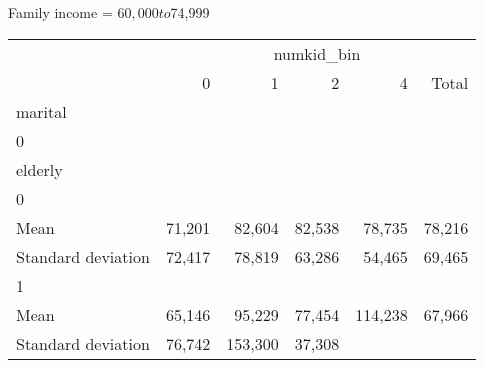 Family income = $60,000 to $74,999
\begin{tabular}{llllll}
\cline{1-6}
\multicolumn{1}{c}{} &
  \multicolumn{5}{|c}{numkid\_bin} \\
\multicolumn{1}{c}{} &
  \multicolumn{1}{|r}{0} &
  \multicolumn{1}{r}{1} &
  \multicolumn{1}{r}{2} &
  \multicolumn{1}{r}{4} &
  \multicolumn{1}{r}{Total} \\
\cline{1-6}
\multicolumn{1}{l}{marital} &
  \multicolumn{1}{|r}{} &
  \multicolumn{1}{r}{} &
  \multicolumn{1}{r}{} &
  \multicolumn{1}{r}{} &
  \multicolumn{1}{r}{} \\
\multicolumn{1}{l}{\hspace{1em}0} &
  \multicolumn{1}{|r}{} &
  \multicolumn{1}{r}{} &
  \multicolumn{1}{r}{} &
  \multicolumn{1}{r}{} &
  \multicolumn{1}{r}{} \\
\multicolumn{1}{l}{\hspace{2em}elderly} &
  \multicolumn{1}{|r}{} &
  \multicolumn{1}{r}{} &
  \multicolumn{1}{r}{} &
  \multicolumn{1}{r}{} &
  \multicolumn{1}{r}{} \\
\multicolumn{1}{l}{\hspace{3em}0} &
  \multicolumn{1}{|r}{} &
  \multicolumn{1}{r}{} &
  \multicolumn{1}{r}{} &
  \multicolumn{1}{r}{} &
  \multicolumn{1}{r}{} \\
\multicolumn{1}{l}{\hspace{4em}Mean} &
  \multicolumn{1}{|r}{71,201} &
  \multicolumn{1}{r}{82,604} &
  \multicolumn{1}{r}{82,538} &
  \multicolumn{1}{r}{78,735} &
  \multicolumn{1}{r}{78,216} \\
\multicolumn{1}{l}{\hspace{4em}Standard deviation} &
  \multicolumn{1}{|r}{72,417} &
  \multicolumn{1}{r}{78,819} &
  \multicolumn{1}{r}{63,286} &
  \multicolumn{1}{r}{54,465} &
  \multicolumn{1}{r}{69,465} \\
\multicolumn{1}{l}{\hspace{3em}1} &
  \multicolumn{1}{|r}{} &
  \multicolumn{1}{r}{} &
  \multicolumn{1}{r}{} &
  \multicolumn{1}{r}{} &
  \multicolumn{1}{r}{} \\
\multicolumn{1}{l}{\hspace{4em}Mean} &
  \multicolumn{1}{|r}{65,146} &
  \multicolumn{1}{r}{95,229} &
  \multicolumn{1}{r}{77,454} &
  \multicolumn{1}{r}{114,238} &
  \multicolumn{1}{r}{67,966} \\
\multicolumn{1}{l}{\hspace{4em}Standard deviation} &
  \multicolumn{1}{|r}{76,742} &
  \multicolumn{1}{r}{153,300} &
  \multicolumn{1}{r}{37,308} &

\end{tabular}
